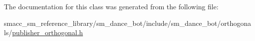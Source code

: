 The documentation for this class was generated from the following file\+:\begin{DoxyCompactItemize}
\item 
smacc\+\_\+sm\+\_\+reference\+\_\+library/sm\+\_\+dance\+\_\+bot/include/sm\+\_\+dance\+\_\+bot/orthogonals/\hyperlink{publisher__orthogonal_8h}{publisher\+\_\+orthogonal.\+h}\end{DoxyCompactItemize}
